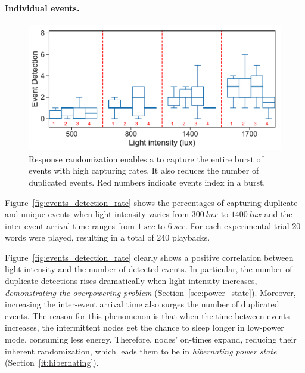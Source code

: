 \paragraph{Individual events.}
\begin{figure}[t]
	\centering
     \includegraphics[width=\columnwidth]{figures/events_burst_rand}
    \caption{Response randomization enables a \cis to capture the entire burst of events with high capturing rates. It also reduces the number of duplicated events. Red numbers indicate events index in a burst.}
    \label{fig:events_burst_rand}
\end{figure}

Figure~\ref{fig:events_detection_rate} shows the percentages of capturing duplicate and unique events when light intensity varies from $\SI{300}{lux}$ to $\SI{1400}{lux}$ and the inter-event arrival time ranges from $\SI{1}{sec}$ to $\SI{6}{sec}$. For each experimental trial 20 words were played, resulting in a total of 240 playbacks. 

Figure~\ref{fig:events_detection_rate} clearly shows a positive correlation between light intensity and the number of detected events. In particular, the number of duplicate detections rises dramatically when light intensity increases, \emph{demonstrating the overpowering problem} (Section~\ref{sec:power_state}). Moreover, increasing the inter-event arrival time also surges the number of duplicated events. The reason for this phenomenon is that when the time between events increases, the intermittent nodes get the chance to sleep longer in low-power mode, consuming less energy. Therefore, nodes' on-times expand, reducing their inherent randomization, which leads them to be in \textit{hibernating power state} (Section~\ref{it:hibernating}).  


